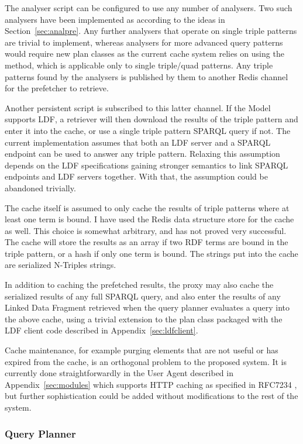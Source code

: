 The analyser script can be configured to use any number of analysers.
Two such analysers have been implemented as according to the ideas in
Section~\ref{sec:analpre}. Any further analysers that operate on
single triple patterns are trivial to implement, whereas analysers for
more advanced query patterns would require new plan classes as the
current cache system relies on using the  method,
which is applicable only to single triple/quad patterns. Any triple
patterns found by the analysers is published by them to another Redis
channel for the prefetcher to retrieve.


Another persistent script is subscribed to this latter channel. If the
Model supports LDF, a retriever will then download
the results of the triple pattern and enter it into the cache, or use
a single triple pattern SPARQL query if not. The current
implementation assumes that both an LDF server and a SPARQL endpoint
can be used to answer any triple pattern. Relaxing this assumption
depends on the LDF specifications gaining stronger semantics to link
SPARQL endpoints and LDF servers together. With that, the assumption
could be abandoned trivially.

The cache itself is assumed to only cache the results of triple
patterns where at least one term is bound. 
I have used the Redis data structure store for the
cache as well. This choice is somewhat arbitrary, and has not proved
very successful. The cache will store the results as an array if two
RDF terms are bound in the triple pattern, or a hash if only one term
is bound. The strings put into the cache are serialized N-Triples
strings.

In addition to caching the prefetched results, the proxy may also
cache the serialized results of any full SPARQL query, and also enter
the results of any Linked Data Fragment retrieved when the query
planner evaluates a query into the above cache, using a trivial
extension to the plan class packaged with the LDF client code
described in Appendix~\ref{sec:ldfclient}.

Cache maintenance, for example purging elements that are not useful or
has expired from the cache, is an orthogonal problem to the proposed
system. It is currently done straightforwardly in the User Agent
described in Appendix~\ref{sec:modules} which supports HTTP caching as
specified in RFC7234 \cite{rfc7234}, but further sophistication could
be added without modifications to the rest of the system.

\subsubsection{Query Planner}\label{sec:implqueryplan}

